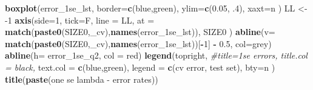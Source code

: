 \documentclass[
]{book}
\newenvironment{Shaded}{\begin{snugshade}}{\end{snugshade}}
\newcommand{\CommentTok}[1]{\textcolor[rgb]{0.56,0.35,0.01}{\textit{#1}}}
\newcommand{\DataTypeTok}[1]{\textcolor[rgb]{0.13,0.29,0.53}{#1}}
\newcommand{\DecValTok}[1]{\textcolor[rgb]{0.00,0.00,0.81}{#1}}
\newcommand{\FloatTok}[1]{\textcolor[rgb]{0.00,0.00,0.81}{#1}}
\newcommand{\KeywordTok}[1]{\textcolor[rgb]{0.13,0.29,0.53}{\textbf{#1}}}
\newcommand{\NormalTok}[1]{#1}
\newcommand{\OperatorTok}[1]{\textcolor[rgb]{0.81,0.36,0.00}{\textbf{#1}}}
\newcommand{\StringTok}[1]{\textcolor[rgb]{0.31,0.60,0.02}{#1}}
\begin{document}
\begin{Shaded}
\begin{Highlighting}[]
\KeywordTok{boxplot}\NormalTok{(error\_1se\_lst, }
  \DataTypeTok{border=}\KeywordTok{c}\NormalTok{(}\StringTok{\textquotesingle{}blue\textquotesingle{}}\NormalTok{,}\StringTok{\textquotesingle{}green\textquotesingle{}}\NormalTok{), }
  \DataTypeTok{ylim=}\KeywordTok{c}\NormalTok{(}\FloatTok{0.05}\NormalTok{, }\FloatTok{.4}\NormalTok{),}
  \DataTypeTok{xaxt=}\StringTok{\textquotesingle{}n\textquotesingle{}}
\NormalTok{)}
\NormalTok{LL <{-}}\StringTok{ }\DecValTok{{-}1}
\KeywordTok{axis}\NormalTok{(}\DataTypeTok{side=}\DecValTok{1}\NormalTok{, }\DataTypeTok{tick=}\NormalTok{F, }\DataTypeTok{line =}\NormalTok{ LL,}
  \DataTypeTok{at =} \KeywordTok{match}\NormalTok{(}\KeywordTok{paste0}\NormalTok{(SIZE0,}\StringTok{\textquotesingle{}\_cv\textquotesingle{}}\NormalTok{),}\KeywordTok{names}\NormalTok{(error\_1se\_lst)), }
\NormalTok{  SIZE0}
\NormalTok{ )}
\KeywordTok{abline}\NormalTok{(}\DataTypeTok{v=} \KeywordTok{match}\NormalTok{(}\KeywordTok{paste0}\NormalTok{(SIZE0,}\StringTok{\textquotesingle{}\_cv\textquotesingle{}}\NormalTok{),}\KeywordTok{names}\NormalTok{(error\_1se\_lst))[}\OperatorTok{{-}}\DecValTok{1}\NormalTok{] }\OperatorTok{{-}}\StringTok{ }\FloatTok{0.5}\NormalTok{, }\DataTypeTok{col=}\StringTok{\textquotesingle{}grey\textquotesingle{}}\NormalTok{)}
\KeywordTok{abline}\NormalTok{(}\DataTypeTok{h=}\NormalTok{ error\_1se\_q2, }\DataTypeTok{col =} \StringTok{\textquotesingle{}red\textquotesingle{}}\NormalTok{)}
\KeywordTok{legend}\NormalTok{(}\StringTok{\textquotesingle{}topright\textquotesingle{}}\NormalTok{, }
   \CommentTok{\#title=\textquotesingle{}1se errors\textquotesingle{}, title.col = \textquotesingle{}black\textquotesingle{},}
   \DataTypeTok{text.col =} \KeywordTok{c}\NormalTok{(}\StringTok{\textquotesingle{}blue\textquotesingle{}}\NormalTok{,}\StringTok{\textquotesingle{}green\textquotesingle{}}\NormalTok{),}
   \DataTypeTok{legend =} \KeywordTok{c}\NormalTok{(}\StringTok{\textquotesingle{}cv error\textquotesingle{}}\NormalTok{, }\StringTok{\textquotesingle{}test set\textquotesingle{}}\NormalTok{),}
   \DataTypeTok{bty=}\StringTok{\textquotesingle{}n\textquotesingle{}}
\NormalTok{ )}
\KeywordTok{title}\NormalTok{(}\KeywordTok{paste}\NormalTok{(}\StringTok{\textquotesingle{}one se lambda {-} error rates\textquotesingle{}}\NormalTok{))}


\end{Highlighting}
\end{Shaded}
\end{document}
